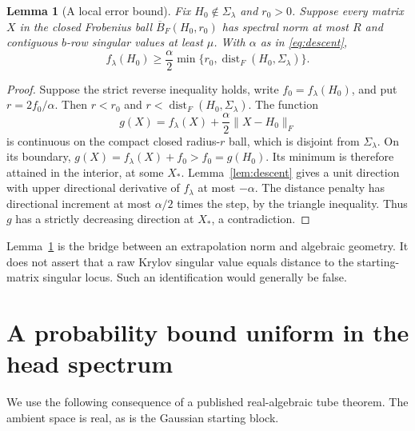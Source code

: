 \documentclass[11pt]{article}
\numberwithin{equation}{section}
\newtheorem{lemma}[theorem]{Lemma}
\theoremstyle{definition}
\newcommand{\dist}{\operatorname{dist}}
\newcommand{\nn}[1]{\lVert #1\rVert}
\begin{document}
\begin{lemma}[A local error bound]\label{lem:distance}
Fix $H_0\notin\Sigma_\lambda$ and $r_0>0$. Suppose every matrix $X$ in the closed Frobenius ball $\overline B_F(H_0,r_0)$ has spectral norm at most $R$ and contiguous $b$-row singular values at least $\mu$. With $\alpha$ as in \eqref{eq:descent},
\begin{equation}\label{eq:distance}
f_\lambda(H_0)\ge\frac\alpha2
\min\{r_0,\dist_F(H_0,\Sigma_\lambda)\}.
\end{equation}
\end{lemma}
\begin{proof}
Suppose the strict reverse inequality holds, write $f_0=f_\lambda(H_0)$, and put $r=2f_0/\alpha$. Then $r<r_0$ and $r<\dist_F(H_0,\Sigma_\lambda)$. The function
\[
g(X)=f_\lambda(X)+\frac\alpha2\nn{X-H_0}_F
\]
is continuous on the compact closed radius-$r$ ball, which is disjoint from $\Sigma_\lambda$. On its boundary, $g(X)=f_\lambda(X)+f_0>f_0=g(H_0)$. Its minimum is therefore attained in the interior, at some $X_*$. Lemma~\ref{lem:descent} gives a unit direction with upper directional derivative of $f_\lambda$ at most $-\alpha$. The distance penalty has directional increment at most $\alpha/2$ times the step, by the triangle inequality. Thus $g$ has a strictly decreasing direction at $X_*$, a contradiction.
\end{proof}

Lemma~\ref{lem:distance} is the bridge between an extrapolation norm and algebraic geometry. It does not assert that a raw Krylov singular value equals distance to the starting-matrix singular locus. Such an identification would generally be false.

\section{A probability bound uniform in the head spectrum}\label{sec:probability}
We use the following consequence of a published real-algebraic tube theorem. The ambient space is real, as is the Gaussian starting block.
\end{document}
